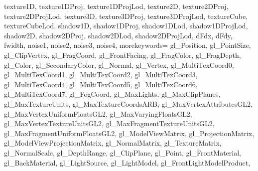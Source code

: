 {{                    texture1D,%
                    texture1DProj,%
                    texture1DProjLod,%
                    texture2D,%
                    texture2DProj,%
                    texture2DProjLod,%
                    texture3D,%
                    texture3DProj,%
                    texture3DProjLod,%
                    textureCube,%
                    textureCubeLod,%
                    shadow1D,%
                    shadow1DProj,%
                    shadow1DLod,%
                    shadow1DProjLod,%
                    shadow2D,%
                    shadow2DProj,%
                    shadow2DLod,%
                    shadow2DProjLod,%
                    dFdx,%
                    dFdy,%
                    fwidth,%
                    noise1,%
                    noise2,%
                    noise3,%
                    noise4},%
    morekeywords={%
                    gl_Position,%
                    gl_PointSize,%
                    gl_ClipVertex,%
                    gl_FragCoord,%
                    gl_FrontFacing,%
                    gl_FragColor,%
                    gl_FragDepth,%
                    gl_Color,%
                    gl_SecondaryColor,%
                    gl_Normal,%
                    gl_Vertex,%
                    gl_MultiTexCoord0,%
                    gl_MultiTexCoord1,%
                    gl_MultiTexCoord2,%
                    gl_MultiTexCoord3,%
                    gl_MultiTexCoord4,%
                    gl_MultiTexCoord5,%
                    gl_MultiTexCoord6,%
                    gl_MultiTexCoord7,%
                    gl_FogCoord,%
                    gl_MaxLights,%
                    gl_MaxClipPlanes,%
                    gl_MaxTextureUnits,%
                    gl_MaxTextureCoordsARB,%
                    gl_MaxVertexAttributesGL2,%
                    gl_MaxVertexUniformFloatsGL2,%
                    gl_MaxVaryingFloatsGL2,%
                    gl_MaxVertexTextureUnitsGL2,%
                    gl_MaxFragmentTextureUnitsGL2,%
                    gl_MaxFragmentUniformFloatsGL2,%
                    gl_ModelViewMatrix,%
                    gl_ProjectionMatrix,%
                    gl_ModelViewProjectionMatrix,%
                    gl_NormalMatrix,%
                    gl_TextureMatrix,%
                    gl_NormalScale,%
                    gl_DepthRange,%
                    gl_ClipPlane,%
                    gl_Point,%
                    gl_FrontMaterial,%
                    gl_BackMaterial,%
                    gl_LightSource,%
                    gl_LightModel,%
                    gl_FrontLightModelProduct,%
}}
